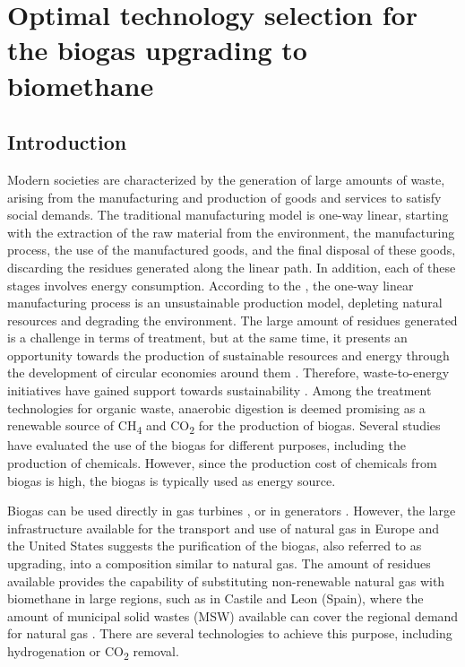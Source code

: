 \chapter{Optimal technology selection for the biogas upgrading to biomethane}\label{ch:BiogasUpgrading}
\begin{refsection}[referencesCh7]

{\color{red}{ADD NOMENCLATURE}}

{\color{red}{UPDATE LETTER OP SUP MAT REFERENCES}}

\section{Introduction}
Modern societies are characterized by the generation of large amounts of waste, arising from the manufacturing and production of goods and services to satisfy social demands. The traditional manufacturing model is one-way linear, starting with the extraction of the raw material from the environment, the manufacturing process, the use of the manufactured goods, and the final disposal of these goods, discarding the residues generated along the linear path. In addition, each of these stages involves energy consumption. According to the \citet{WCED1987}, the one-way linear manufacturing process is an unsustainable production model, depleting natural resources and degrading the environment. The large amount of residues generated is a challenge in terms of treatment, but at the same time, it presents an opportunity towards the production of sustainable resources and energy through the development of circular economies around them \citep{WorldEnergyCouncil2016}. Therefore, waste-to-energy initiatives have gained support towards sustainability \citep{korhonen2018circular}. Among the treatment technologies for organic waste, anaerobic digestion is deemed promising as a renewable source of CH\textsubscript{4} and CO\textsubscript{2} for the production of biogas. Several studies have evaluated the use of the biogas for different purposes, including the production of chemicals. However, since the production cost of chemicals from biogas is high, the biogas is typically used as energy source.

Biogas can be used directly in gas turbines \citep{somehsaraei2014performance}, or in generators \citep{reddy2016investigation}. However, the large infrastructure available for the transport and use of natural gas in Europe \citep{Entsog} and the United States \citep{EIAPipelines} suggests the purification of the biogas, also referred to as upgrading, into a composition similar to natural gas. The amount of residues available provides the capability of substituting non-renewable natural gas with biomethane in large regions, such as in Castile and Leon (Spain), where the amount of municipal solid wastes (MSW) available can cover the regional demand for natural gas \citep{taifouris2018multiscale}. There are several technologies to achieve this purpose, including hydrogenation or CO\textsubscript{2} removal.


\end{refsection}
